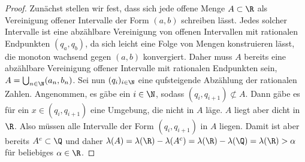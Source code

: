 \documentclass{article}
\begin{document}
\begin{enumerate}[(a)]
\begin{proof}
            Zunächst stellen wir fest, dass sich jede offene Menge $A \subset \R$ als Vereinigung offener Intervalle der Form $(a,b)$ schreiben lässt. Jedes solcher Intervalle ist eine abzählbare Vereinigung von offenen Intervallen mit rationalen Endpunkten $(q_a, q_b)$, da sich leicht eine Folge von Mengen konstruieren lässt, die monoton wachsend gegen $(a,b)$ konvergiert. Daher muss $A$ bereits eine abzählbare Vereinigung offener Intervalle mit rationalen Endpunkten sein, $A = \bigcup_{n\in \N} (a_n, b_n)$. Sei nun $(q_i)_{i\in \N}$ eine qufsteigende Abzählung der rationalen Zahlen. Angenommen, es gäbe ein $i\in \N$, sodass $(q_i, q_{i+1}) \not \subset A$. Dann gäbe es für ein $x\in (q_i, q_{i+1})$ eine Umgebung, die nicht in $A$ läge. $A$ liegt aber dicht in $\R$. Also müssen alle Intervalle der Form $(q_i, q_{i+1})$ in $A$ liegen. Damit ist aber bereits $A^c \subset \Q$ und daher $\lambda(A) = \lambda(\R) - \lambda(A^c) = \lambda(\R) - \lambda(\Q) = \lambda(\R) > \alpha$ für beliebiges $\alpha \in \R$.
        \end{proof}
    \end{enumerate}
\end{document}
